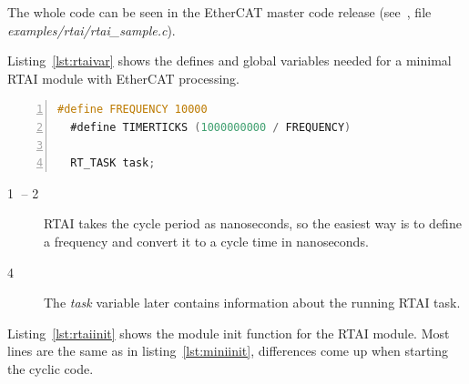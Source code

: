 \documentclass[a4paper,12pt,BCOR6mm,bibtotoc,idxtotoc]{scrbook}
\begin{document}
The whole code can be seen in the EtherCAT master code release
(see~\cite{etherlab}, file \textit{examples/rtai/rtai\_sample.c}).

Listing~\ref{lst:rtaivar} shows the defines and global variables
needed for a minimal RTAI module with EtherCAT processing.

\begin{lstlisting}[language=C,numbers=left,caption={RTAI task
    declaration},label={lst:rtaivar}]
  #define FREQUENCY 10000
  #define TIMERTICKS (1000000000 / FREQUENCY)

  RT_TASK task;
\end{lstlisting}

\begin{description}
\item[\normalfont\textcircled{\tiny 1} -- \textcircled{\tiny 2}] RTAI
  takes the cycle period as nanoseconds, so the easiest way is to
  define a frequency and convert it to a cycle time in nanoseconds.
\item[\normalfont\textcircled{\tiny 4}] The \textit{task} variable
  later contains information about the running RTAI task.
\end{description}

Listing~\ref{lst:rtaiinit} shows the module init function for the RTAI
module. Most lines are the same as in listing~\ref{lst:miniinit},
differences come up when starting the cyclic code.
\end{document}
